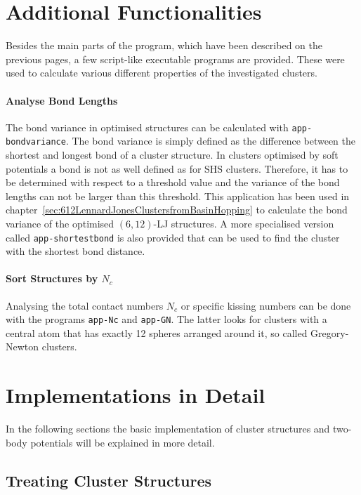 \section{Additional Functionalities}
\label{sec:AdditionalFunctions}

Besides the main parts of the program, which have been described on the previous
pages, a few script-like executable programs are provided. These were used to
calculate various different properties of the investigated clusters.

\paragraph{Analyse Bond Lengths}%
The bond variance in optimised structures can be calculated with
\texttt{app-bondvariance}. The bond variance is simply defined as the difference
between the shortest and longest bond of a cluster structure. In clusters
optimised by soft potentials a bond is not as well defined as for \ac{SHS}
clusters. Therefore, it has to be determined with respect to a threshold value
and the variance of the bond lengths can not be larger than this threshold. This
application has been used in
chapter~\ref{sec:612LennardJonesClustersfromBasinHopping} to calculate the bond
variance of the optimised $(6,12)$-\ac{LJ} structures. A more specialised
version called \texttt{app-shortestbond} is also provided that can be used to
find the cluster with the shortest bond distance.

\paragraph{Sort Structures by $N_c$}%

Analysing the total contact numbers $N_c$ or specific kissing numbers can be
done with the programs \texttt{app-Nc} and \texttt{app-GN}. The latter looks
for clusters with a central atom that has exactly 12 spheres arranged around
it, so called Gregory-Newton clusters.

\section{Implementations in Detail}
\label{sec:ImplementationsinDetail}

In the following sections the basic implementation of cluster structures and
two-body potentials will be explained in more detail.

\subsection{Treating Cluster Structures}
\label{sec:thestructureclass}

